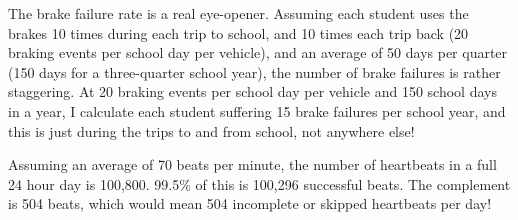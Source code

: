 \vskip 10pt

The brake failure rate is a real eye-opener.  Assuming each student uses the brakes 10 times during each trip to school, and 10 times each trip back (20 braking events per school day per vehicle), and an average of 50 days per quarter (150 days for a three-quarter school year), the number of brake failures is rather staggering.  At 20 braking events per school day per vehicle and 150 school days in a year, I calculate each student suffering 15 brake failures per school year, and this is just during the trips to and from school, not anywhere else!

\vskip 10pt

Assuming an average of 70 beats per minute, the number of heartbeats in a full 24 hour day is 100,800.  99.5\% of this is 100,296 successful beats.  The complement is 504 beats, which would mean 504 incomplete or skipped heartbeats per day!




